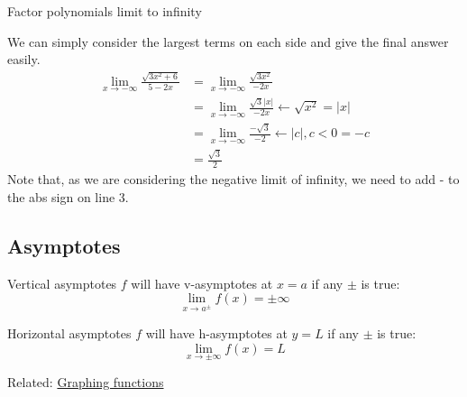 \documentclass{article}
\begin{document}
\begin{example}
    Factor polynomials limit to infinity

    We can simply consider the largest terms on each side and give the final answer easily.
    \begin{align*}
        \lim_{x \to -\infty } \frac{{\sqrt {3{x^2} + 6} }}{{5 - 2x}} & =\lim_{x \to -\infty }\frac{\sqrt{3x^2}}{-2x}                           \\
                                                                     & =\lim_{x \to -\infty }\frac{\sqrt{3}|x|}{-2x} \leftarrow \sqrt{x^2}=|x| \\
                                                                     & =\lim_{x \to -\infty }\frac{-\sqrt{3}}{-2} \leftarrow |c|,c<0=-c        \\
                                                                     & =\frac{\sqrt{3}}{2}
    \end{align*}
    Note that, as we are considering the negative limit of infinity, we need to add - to the abs sign on line 3.
\end{example}

\label{sec:asymptotes}
\subsection{Asymptotes}
\begin{definition}
    {Vertical asymptotes}
    $f$ will have v-asymptotes at $x=a$ if any $\pm$ is true:
    \[\lim_{x\to a^\pm}f(x)=\pm\infty\]
\end{definition}
\begin{definition}
    {Horizontal asymptotes}
    $f$ will have h-asymptotes at $y=L$ if any $\pm$ is true:
    \[\lim_{x\to\pm\infty}f(x)=L\]
\end{definition}
Related: \hyperref[sec:graph]{Graphing functions}

\label{sec:trigo}
\end{document}
